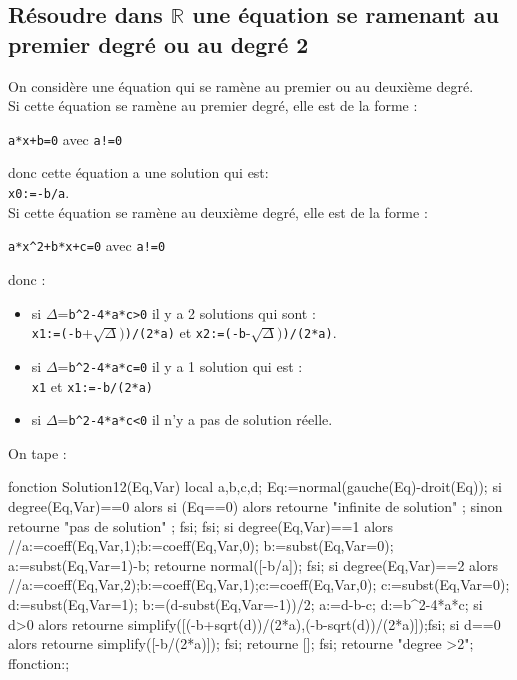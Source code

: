 \documentclass[12pt,a4paper]{book}
\begin{document}
\begin{giacjshere}
\section{R\'esoudre dans $\mathbb{R}$ une \'equation se ramenant au premier degr\'e ou au degr\'e 2}\label{sec:Solution12}
On consid\`ere une \'equation qui se ram\`ene au premier ou au deuxi\`eme
degr\'e.\\
Si cette \'equation se ram\`ene au premier degr\'e, elle est de la forme :
\begin{center}{\tt a*x+b=0} avec {\tt a!=0}\end{center}
 donc cette \'equation a une solution qui est:\\
 {\tt x0:=-b/a}.\\
Si cette \'equation se ram\`ene au deuxi\`eme degr\'e, elle est de la forme :
\begin{center}{\tt a*x\verb|^|2+b*x+c=0} avec {\tt a!=0}\end{center} 
donc :
\begin{itemize}
\item si $\Delta$={\tt b\verb|^|2-4*a*c>0} il y a 2 solutions qui sont :\\
  {\tt x1:=(-b}+$\sqrt\Delta)${\tt )/(2*a)} et
 {\tt x2:=(-b}-$\sqrt\Delta)${\tt )/(2*a)}.
\item si $\Delta$={\tt b\verb|^|2-4*a*c=0} il y a 1 solution qui est :\\
 {\tt x1} et {\tt x1:=-b/(2*a)}
\item si $\Delta$={\tt b\verb|^|2-4*a*c<0} il n'y a pas de solution r\'eelle.
\end{itemize}
On tape :
\begin{giaconload}
fonction Solution12(Eq,Var)
 local a,b,c,d;
 Eq:=normal(gauche(Eq)-droit(Eq));
 si degree(Eq,Var)==0 alors 
   si (Eq==0) alors retourne "infinite de solution" ;
   sinon retourne "pas de solution" ;
   fsi;
 fsi; 
 si degree(Eq,Var)==1 alors 
   //a:=coeff(Eq,Var,1);b:=coeff(Eq,Var,0);
   b:=subst(Eq,Var=0);
   a:=subst(Eq,Var=1)-b;
   retourne normal([-b/a]);
 fsi;
 si degree(Eq,Var)==2 alors 
   //a:=coeff(Eq,Var,2);b:=coeff(Eq,Var,1);c:=coeff(Eq,Var,0);
   c:=subst(Eq,Var=0);
   d:=subst(Eq,Var=1);
   b:=(d-subst(Eq,Var=-1))/2;
   a:=d-b-c;
   d:=b^2-4*a*c;
   si d>0 alors retourne simplify([(-b+sqrt(d))/(2*a),(-b-sqrt(d))/(2*a)]);fsi;
   si d==0 alors retourne simplify([-b/(2*a)]); fsi;
   retourne [];
 fsi;
 retourne "degree >2";
ffonction:;
\end{giaconload}
\\
\\
\\
\\



\end{giacjshere}
\end{document}
